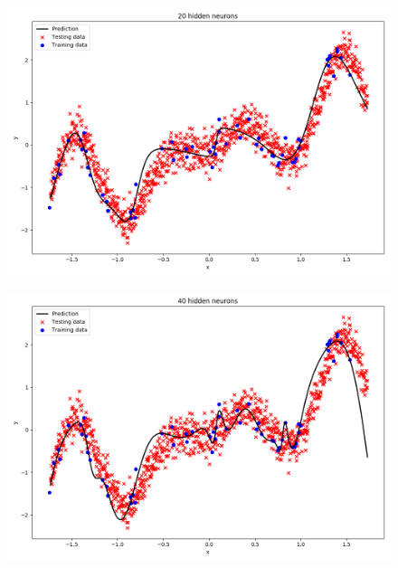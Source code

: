 \documentclass[a4paper]{article}
\begin{document}
\begin{enumerate}[label=(\alph*)]
\begin{itemize}
\begin{figure}[htp]
\centering
\begin{minipage}{0.4\textwidth}
  \includegraphics[scale=0.25]{plots/11c_20.png}
  \label{plot_simple_nh2}
\end{minipage}
\hfill
\begin{minipage}{0.4\textwidth}
  \includegraphics[scale=0.25]{plots/11c_40.png}
  \label{plot_simple_nh8}
\end{minipage}
\end{figure}

\newpage


\end{itemize}
\end{enumerate}
\end{document}
